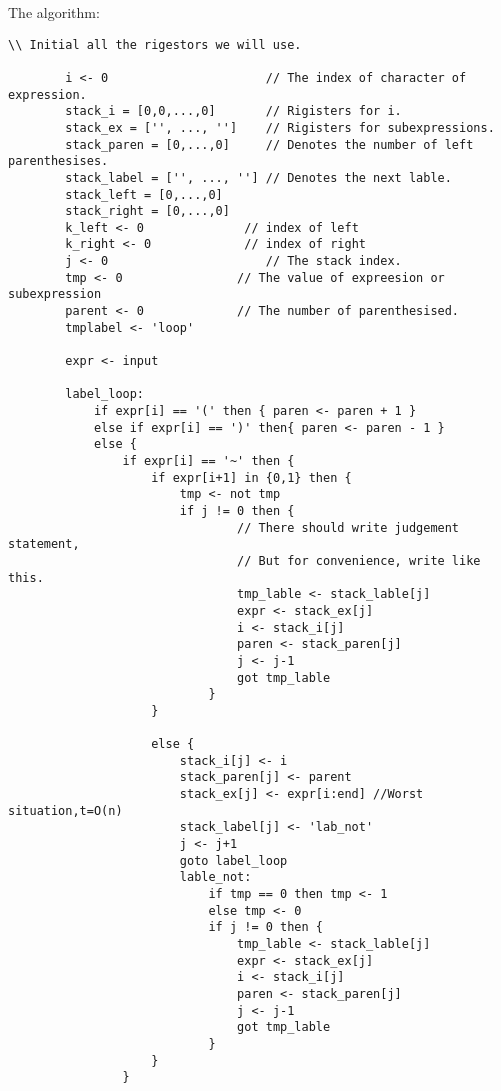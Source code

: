 \documentclass[a4papper]{article}
\theoremstyle{neosn}
\begin{document}
    The algorithm: \\

    \begin{lstlisting}[label={lst:lstlisting2}]
        \\ Initial all the rigestors we will use.

        i <- 0                      // The index of character of expression.
        stack_i = [0,0,...,0]       // Rigisters for i.
        stack_ex = ['', ..., '']    // Rigisters for subexpressions.
        stack_paren = [0,...,0]     // Denotes the number of left parenthesises.
        stack_label = ['', ..., ''] // Denotes the next lable.
        stack_left = [0,...,0]
        stack_right = [0,...,0]
        k_left <- 0              // index of left
        k_right <- 0             // index of right
        j <- 0                      // The stack index.
        tmp <- 0                // The value of expreesion or subexpression
        parent <- 0             // The number of parenthesised.
        tmplabel <- 'loop'

        expr <- input

        label_loop:
            if expr[i] == '(' then { paren <- paren + 1 }
            else if expr[i] == ')' then{ paren <- paren - 1 }
            else {
                if expr[i] == '~' then {
                    if expr[i+1] in {0,1} then {
                        tmp <- not tmp
                        if j != 0 then {
                                // There should write judgement statement,
                                // But for convenience, write like this.
                                tmp_lable <- stack_lable[j]
                                expr <- stack_ex[j]
                                i <- stack_i[j]
                                paren <- stack_paren[j]
                                j <- j-1
                                got tmp_lable
                            }
                    }

                    else {
                        stack_i[j] <- i
                        stack_paren[j] <- parent
                        stack_ex[j] <- expr[i:end] //Worst situation,t=O(n)
                        stack_label[j] <- 'lab_not'
                        j <- j+1
                        goto label_loop
                        lable_not:
                            if tmp == 0 then tmp <- 1
                            else tmp <- 0
                            if j != 0 then {
                                tmp_lable <- stack_lable[j]
                                expr <- stack_ex[j]
                                i <- stack_i[j]
                                paren <- stack_paren[j]
                                j <- j-1
                                got tmp_lable
                            }
                    }
                }


\end{lstlisting}
\end{document}
